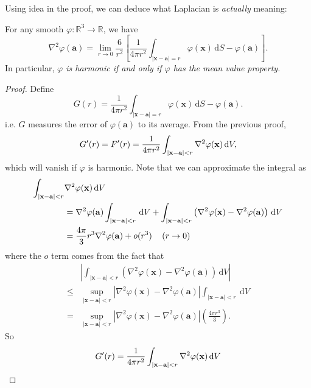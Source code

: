 Using idea in the proof, we can deduce what Laplacian is \textit{actually} meaning:
\begin{proposition}
    For any smooth $ \varphi: \mathbb{R}^{3}\to \mathbb{R} $, we have 
    \[
        \nabla^{2} \varphi(\mathbf{a})=\lim _{r \rightarrow 0} \frac{6}{r^{2}}\left[\frac{1}{4 \pi r^{2}} \int_{|\mathbf{x}-\mathbf{a}|=r} \varphi(\mathbf{x})\, \mathrm{d} S-\varphi(\mathbf{a})\right].
    \]
    In particular, \textit{$ \varphi $ is harmonic if and only if $ \varphi $ has the mean value property.}
\end{proposition}
\begin{proof}
    Define 
    \[
        G(r) = \frac{1}{4 \pi r^{2}} \int_{|\mathbf{x}-\mathbf{a}|=r} \varphi(\mathbf{x})\, \mathrm{d} S-\varphi(\mathbf{a}).
    \]
    i.e. $G$ measures the error of $ \varphi(\mathbf{a}) $ to its average. From the previous proof,
    \[
        G'(r) = F'(r) = \frac{1}{4\pi r^2} \int_{|\mathbf{x}-\mathbf{a}|<r} \laplacian \varphi(\mathbf{x}) \,\mathrm{d}V,
    \]
    which will vanish if $ \varphi $ is harmonic. Note that we can approximate the integral as
    \begin{align*}
        \int_{|\mathbf{x}-\mathbf{a}|<r} &\laplacian \varphi(\mathbf{x}) \,\mathrm{d}V \\
        &= \laplacian \varphi(\mathbf{a})\int_{|\mathbf{x}-\mathbf{a}|<r} \,\mathrm{d}V + \int_{|\mathbf{x}-\mathbf{a}|<r} \left( \laplacian \varphi(\mathbf{x})-\laplacian \varphi(\mathbf{a}) \right) \,\mathrm{d}V\\ 
        &= \frac{4\pi}{3}r^3\laplacian \varphi(\mathbf{a})+ o(r^3) \quad\left(r \to 0\right)
    \end{align*} 
    where the $o$ term comes from the fact that
    \[
        \begin{aligned}
            &\left|\int_{|\mathbf{x}-\mathbf{a}|<r}\left(\nabla^{2} \varphi(\mathbf{x})-\nabla^{2} \varphi(\mathbf{a})\right) \,\mathrm{d} V\right|\\ 
             \le& \sup _{|\mathbf{x}-\mathbf{a}|<r}\left|\nabla^{2} \varphi(\mathbf{x})-\nabla^{2} \varphi(\mathbf{a})\right| \int_{|\mathbf{x}-\mathbf{a}|<r} \mathrm{~d} V \\
            =&\sup _{|\mathbf{x}-\mathbf{a}|<r}\left|\nabla^{2} \varphi(\mathbf{x})-\nabla^{2} \varphi(\mathbf{a})\right|\left(\frac{4 \pi r^{3}}{3}\right).
        \end{aligned}
    \]
    So 
    \begin{align*}
        G'(r) &= \frac{1}{4\pi r^2}\int_{|\mathbf{x}-\mathbf{a}|<r} \laplacian \varphi(\mathbf{x}) \,\mathrm{d}V\\ 

\end{align*}
\end{proof}
